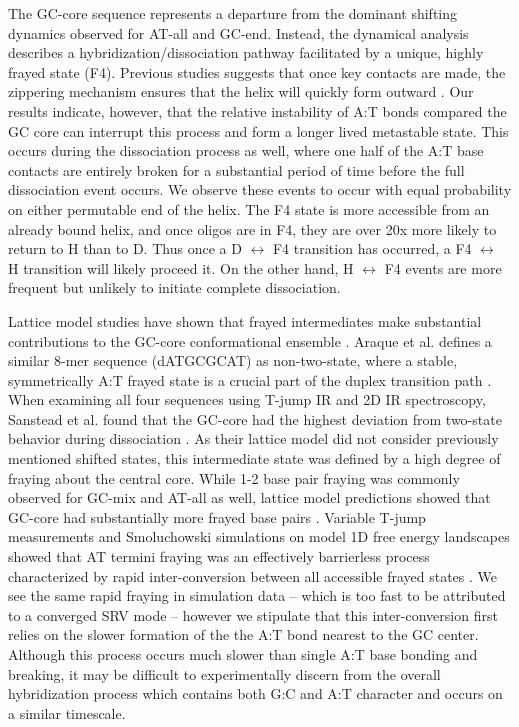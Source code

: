 \documentclass[journal=jpcbfk,manuscript=article]{achemso}
\begin{document}
The GC-core sequence represents a departure from the dominant shifting dynamics observed for AT-all and GC-end. Instead, the dynamical analysis describes a hybridization/dissociation pathway facilitated by a unique, highly frayed state (F4). Previous studies suggests that once key contacts are made, the zippering mechanism ensures that the helix will quickly form outward \citep{Romano2013DNADependence, Yin2011KineticsHybridization}. Our results indicate, however, that the relative instability of A:T bonds compared the GC core can interrupt this process and form a longer lived metastable state. This occurs during the dissociation process as well, where one half of the A:T base contacts are entirely broken for a substantial period of time before the full dissociation event occurs. We observe these events to occur with equal probability on either permutable end of the helix. The F4 state is more accessible from an already bound helix, and once oligos are in F4, they are over 20x more likely to return to H than to D. Thus once a D $\leftrightarrow$ F4 transition has occurred, a F4 $\leftrightarrow$ H transition will likely proceed it. On the other hand, H $\leftrightarrow$ F4 events are more frequent but unlikely to initiate complete dissociation.

Lattice model studies have shown that frayed intermediates make substantial contributions to the GC-core conformational ensemble \citep{Araque2016LatticeCooperativity, Phys2019}. Araque et al. defines a similar 8-mer sequence (dATGCGCAT) as non-two-state, where a stable, symmetrically A:T frayed state is a crucial part of the duplex transition path \citep{Araque2016LatticeCooperativity}. When examining all four sequences using T-jump IR and 2D IR spectroscopy, Sanstead et al. found that the GC-core had the highest deviation from two-state behavior during dissociation \citep{Sanstead2016}. As their lattice model did not consider previously mentioned shifted states, this intermediate state was defined by a high degree of fraying about the central core. While 1-2 base pair fraying was commonly observed for GC-mix and AT-all as well, lattice model predictions showed that GC-core had substantially more frayed base pairs \citep{Phys2019}. Variable T-jump measurements and Smoluchowski simulations on model 1D free energy landscapes showed that AT termini fraying was an effectively barrierless process characterized by rapid inter-conversion between all accessible frayed states \citep{Sanstead2018DirectDehybridization}. We see the same rapid fraying in simulation data -- which is too fast to be attributed to a converged SRV mode -- however we stipulate that this inter-conversion first relies on the slower formation of the the A:T bond nearest to the GC center.  Although this process occurs much slower than single A:T base bonding and breaking, it may be difficult to experimentally discern from the overall hybridization process which contains both G:C and A:T character and occurs on a similar timescale.
\end{document}
